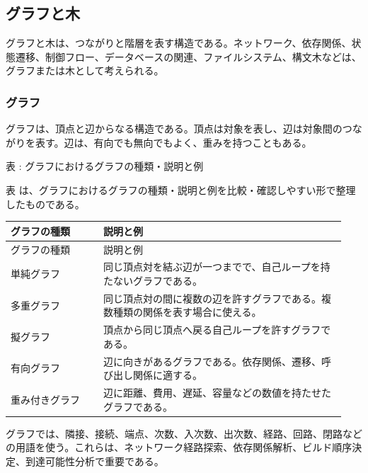 \subsection{グラフと木}
グラフと木は、つながりと階層を表す構造である。ネットワーク、依存関係、状態遷移、制御フロー、データベースの関連、ファイルシステム、構文木などは、グラフまたは木として考えられる。

\subsubsection{グラフ}
グラフは、頂点と辺からなる構造である。頂点は対象を表し、辺は対象間のつながりを表す。辺は、有向でも無向でもよく、重みを持つこともある。

\par\smallskip\noindent{}\label{tab:ch17-09}表 \thetable: グラフにおけるグラフの種類・説明と例\par\smallskip
表 \thetable は、グラフにおけるグラフの種類・説明と例を比較・確認しやすい形で整理したものである。\par\smallskip
\begin{longtable}{>{\raggedright\arraybackslash}p{0.26\linewidth} >{\raggedright\arraybackslash}p{0.68\linewidth}}
\toprule
グラフの種類 & 説明と例 \\
\midrule
\endfirsthead
\toprule
グラフの種類 & 説明と例 \\
\midrule
\endhead
単純グラフ & 同じ頂点対を結ぶ辺が一つまでで、自己ループを持たないグラフである。 \\
多重グラフ & 同じ頂点対の間に複数の辺を許すグラフである。複数種類の関係を表す場合に使える。 \\
擬グラフ & 頂点から同じ頂点へ戻る自己ループを許すグラフである。 \\
有向グラフ & 辺に向きがあるグラフである。依存関係、遷移、呼び出し関係に適する。 \\
重み付きグラフ & 辺に距離、費用、遅延、容量などの数値を持たせたグラフである。 \\
\bottomrule
\end{longtable}
グラフでは、隣接、接続、端点、次数、入次数、出次数、経路、回路、閉路などの用語を使う。これらは、ネットワーク経路探索、依存関係解析、ビルド順序決定、到達可能性分析で重要である。

